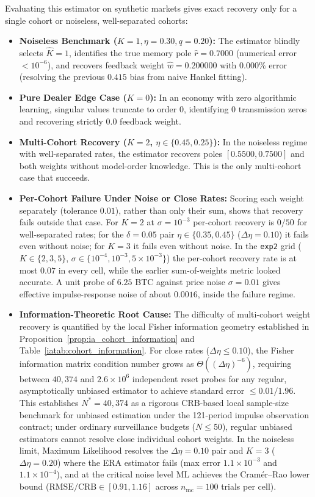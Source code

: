 \documentclass[12pt]{article}
\theoremstyle{definition}
\theoremstyle{remark}
\begin{document}
Evaluating this estimator on synthetic markets gives exact recovery only for a single cohort or noiseless, well-separated cohorts:
\begin{itemize}
\item \textbf{Noiseless Benchmark ($K=1, \eta = 0.30, q = 0.20$):} The estimator blindly selects $\hat{K} = 1$, identifies the true memory pole $\hat{r} = 0.7000$ (numerical error $< 10^{-6}$), and recovers feedback weight $\hat{w} = 0.200000$ with $0.000\%$ error (resolving the previous $0.415$ bias from naive Hankel fitting).
\item \textbf{Pure Dealer Edge Case ($K=0$):} In an economy with zero algorithmic learning, singular values truncate to order 0, identifying 0 transmission zeros and recovering strictly $0.0$ feedback weight.
\item \textbf{Multi-Cohort Recovery ($K=2$, $\eta \in \{0.45, 0.25\}$):} In the noiseless regime with well-separated rates, the estimator recovers poles $[0.5500, 0.7500]$ and both weights without model-order knowledge. This is the only multi-cohort case that succeeds.
\item \textbf{Per-Cohort Failure Under Noise or Close Rates:} Scoring each weight separately (tolerance $0.01$), rather than only their sum, shows that recovery fails outside that case. For $K=2$ at $\sigma=10^{-3}$ per-cohort recovery is $0/50$ for well-separated rates; for the $\delta=0.05$ pair $\eta\in\{0.35,0.45\}$ ($\Delta\eta=0.10$) it fails even without noise; for $K=3$ it fails even without noise. In the \texttt{exp2} grid ($K\in\{2,3,5\}$, $\sigma\in\{10^{-4},10^{-3},5\times10^{-3}\}$) the per-cohort recovery rate is at most $0.07$ in every cell, while the earlier sum-of-weights metric looked accurate. A unit probe of $6.25$ BTC against price noise $\sigma=0.01$ gives effective impulse-response noise of about $0.0016$, inside the failure regime.
\item \textbf{Information-Theoretic Root Cause:} The difficulty of multi-cohort weight recovery is quantified by the local Fisher information geometry established in Proposition~\ref{prop:ia_cohort_information} and Table~\ref{iatab:cohort_information}. For close rates ($\Delta\eta \le 0.10$), the Fisher information matrix condition number grows as $\Theta((\Delta\eta)^{-6})$, requiring between $40{,}374$ and $2.6\times 10^6$ independent reset probes for any regular, asymptotically unbiased estimator to achieve standard error $\le 0.01 / 1.96$. This establishes $N^* = 40{,}374$ as a rigorous CRB-based local sample-size benchmark for unbiased estimation under the 121-period impulse observation contract; under ordinary surveillance budgets ($N \le 50$), regular unbiased estimators cannot resolve close individual cohort weights. In the noiseless limit, Maximum Likelihood resolves the $\Delta\eta=0.10$ pair and $K=3$ ($\Delta\eta=0.20$) where the ERA estimator fails (max error $1.1 \times 10^{-3}$ and $1.1 \times 10^{-4}$), and at the critical noise level ML achieves the Cram\'er--Rao lower bound ($\text{RMSE}/\text{CRB} \in [0.91, 1.16]$ across $n_{\mathrm{mc}} = 100$ trials per cell).
\end{itemize}
\end{document}

